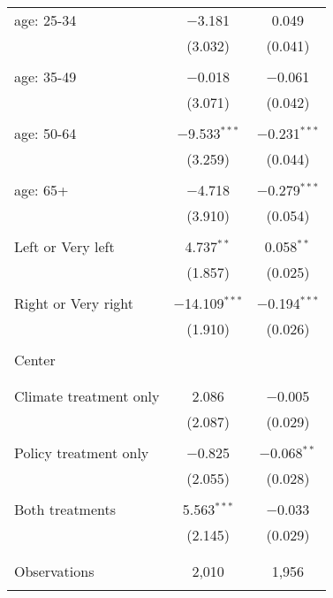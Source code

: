 \begin{tabular}{@{\extracolsep{5pt}}lcc}
 age: 25-34 & $-$3.181 & 0.049 \\ 
  & (3.032) & (0.041) \\ 
  & & \\ 
 age: 35-49 & $-$0.018 & $-$0.061 \\ 
  & (3.071) & (0.042) \\ 
  & & \\ 
 age: 50-64 & $-$9.533$^{***}$ & $-$0.231$^{***}$ \\ 
  & (3.259) & (0.044) \\ 
  & & \\ 
 age: 65+ & $-$4.718 & $-$0.279$^{***}$ \\ 
  & (3.910) & (0.054) \\ 
  & & \\ 
 Left or Very left & 4.737$^{**}$ & 0.058$^{**}$ \\ 
  & (1.857) & (0.025) \\ 
  & & \\ 
 Right or Very right & $-$14.109$^{***}$ & $-$0.194$^{***}$ \\ 
  & (1.910) & (0.026) \\ 
  & & \\ 
 Center &  &  \\ 
  &  &  \\ 
  & & \\ 
 Climate treatment only & 2.086 & $-$0.005 \\ 
  & (2.087) & (0.029) \\ 
  & & \\ 
 Policy treatment only & $-$0.825 & $-$0.068$^{**}$ \\ 
  & (2.055) & (0.028) \\ 
  & & \\ 
 Both treatments & 5.563$^{***}$ & $-$0.033 \\ 
  & (2.145) & (0.029) \\ 
  & & \\ 
\hline \\[-1.8ex] 

Observations & 2,010 & 1,956 \\ 
\hline 
\hline \\[-1.8ex] 
\end{tabular} 